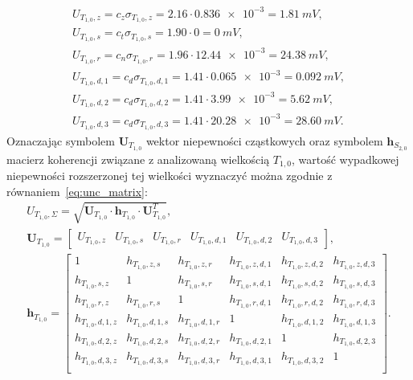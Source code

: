 \begin{gather}
U_{T_{1,0},z} = c_{z} \sigma_{T_{1,0},z} = \num{2.16} \cdot \num{0.836e-3} = \qty{1.81}{mV} \label{eq:sym_partd_output_unc_roun_T_1_0},\\
U_{T_{1,0},s} = c_{t} \sigma_{T_{1,0},s} = \num{1.90} \cdot \num{0} = \qty{0}{mV} \label{eq:sym_partd_output_unc_stat_T_1_0}, \\
U_{T_{1,0},r} = c_{n} \sigma_{T_{1,0},r} = \num{1.96} \cdot \num{12.44e-3} = \qty{24.38}{mV} \label{eq:sym_partd_output_unc_rand_T_1_0}, \\
U_{T_{1,0},d,1} = c_{d} \sigma_{T_{1,0},d,1} = \num{1.41} \cdot \num{0.065e-3} = \qty{0.092}{mV} \label{eq:sym_partd_output_unc_dyn_1_T_1_0}, \\
U_{T_{1,0},d,2} = c_{d} \sigma_{T_{1,0},d,2} = \num{1.41} \cdot \num{3.99e-3} = \qty{5.62}{mV} \label{eq:sym_partd_output_unc_dyn_2_T_1_0}, \\
U_{T_{1,0},d,3} = c_{d} \sigma_{T_{1,0},d,3} = \num{1.41} \cdot \num{20.28e-3} = \qty{28.60}{mV} \label{eq:sym_partd_output_unc_dyn_3_T_1_0}.
\end{gather}
Oznaczając symbolem $\mathbf{U}_{T_{1,0}}$ wektor niepewności cząstkowych oraz symbolem  $\mathbf{h}_{S_{2,0}}$ macierz koherencji związane z analizowaną wielkością $T_{1,0}$, wartość wypadkowej niepewności rozszerzonej tej wielkości wyznaczyć można zgodnie z równaniem~\eqref{eq:unc_matrix}:
\begin{gather}
U_{T_{1,0},\Sigma} = \sqrt{\mathbf{U}_{T_{1,0}} \cdot \mathbf{h}_{T_{1,0}} \cdot \mathbf{U}_{T_{1,0}}^{T}} \label{eq:sym_partd_output_unc_summul_T_1_0}, \\
\mathbf{U}_{T_{1,0}} =
\begin{bmatrix}
U_{T_{1,0},z} & U_{T_{1,0},s} & U_{T_{1,0},r} & U_{T_{1,0},d,1} & U_{T_{1,0},d,2} & U_{T_{1,0},d,3}
\end{bmatrix}
\label{eq:sym_partd_output_unc_sumuvect_T_1_0_a}, \\
\mathbf{h}_{T_{1,0}} =
\begin{bmatrix}
1                 & h_{T_{1,0},z,s}   & h_{T_{1,0},z,r}   & h_{T_{1,0},z,d,1} & h_{T_{1,0},z,d,2} & h_{T_{1,0},z,d,3} \\
h_{T_{1,0},s,z}   & 1                 & h_{T_{1,0},s,r}   & h_{T_{1,0},s,d,1} & h_{T_{1,0},s,d,2} & h_{T_{1,0},s,d,3} \\
h_{T_{1,0},r,z}   & h_{T_{1,0},r,s}   & 1                 & h_{T_{1,0},r,d,1} & h_{T_{1,0},r,d,2} & h_{T_{1,0},r,d,3} \\
h_{T_{1,0},d,1,z} & h_{T_{1,0},d,1,s} & h_{T_{1,0},d,1,r} & 1                 & h_{T_{1,0},d,1,2} & h_{T_{1,0},d,1,3} \\
h_{T_{1,0},d,2,z} & h_{T_{1,0},d,2,s} & h_{T_{1,0},d,2,r} & h_{T_{1,0},d,2,1} & 1                 & h_{T_{1,0},d,2,3} \\
h_{T_{1,0},d,3,z} & h_{T_{1,0},d,3,s} & h_{T_{1,0},d,3,r} & h_{T_{1,0},d,3,1} & h_{T_{1,0},d,3,2} & 1                 \\
\end{bmatrix}
\label{eq:sym_partd_output_unc_sumcoher_T_1_0_a}.
\end{gather}
